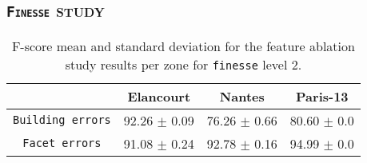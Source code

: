    \subsection{\textsc{\texttt{Finesse} study}}
        \begin{table}
            \footnotesize
            \begin{tabular}{c c c c}
                \toprule
                & \textbf{Elancourt} & \textbf{Nantes} & \textbf{Paris-13}\\
                \midrule
                \texttt{Building errors} & 92.26 $\pm$ 0.09 & 76.26 $\pm$ 0.66 & 80.60 $\pm$ 0.0 \\
                \midrule
                \texttt{Facet errors} & 91.08 $\pm$ 0.24 & 92.78 $\pm$ 0.16 & 94.99 $\pm$ 0.0 \\
                \bottomrule
            \end{tabular}
            \caption{
                \label{tab::f_score_ablation_f2}
                F-score mean and standard deviation for the feature ablation study results per zone for \texttt{finesse} level 2.
            }
        \end{table}

